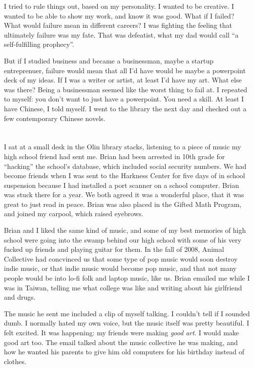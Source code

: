 I tried to rule things out, based on my personality.  I wanted to be creative.
I wanted to be able to show my work, and know it was good.  What if I failed?
What would failure mean in different careers?  I was fighting the feeling that
ultimately failure was my fate.  That was defeatist, what my dad would call ``a
self-fulfilling prophecy''.  

But if I studied business and became a businessman, maybe a startup
entreprenuer, failure would mean that all I'd have would be maybe a powerpoint
deck of my ideas.  If I was a writer or artist, at least I'd have my art.  What
else was there?  Being a businessman seemed like the worst thing to fail at.  I
repeated to myself: you don't want to just have a powerpoint.  You need a skill.
At least I have Chinese, I told myself.  I went to the library the next day and
checked out a few contemporary Chinese novels.

\section{}

I sat at a small desk in the Olin library stacks, listening to a piece of music
my high school friend had sent me.  Brian had been arrested in 10th grade for
``hacking'' the school's database, which included social security numbers.  We
had become friends when I was sent to the Harkness Center for five days of in
school suspension because I had installed a port scanner on a school computer.
Brian was stuck there for a year.  We both agreed it was a wonderful place, that
it was great to just read in peace.  Brian was also placed in the Gifted Math
Program, and joined my carpool, which raised eyebrows.

Brian and I liked the same kind of music, and some of my best memories of high
school were going into the swamp behind our high school with some of his very
fucked up friends and playing guitar for them.  In the fall of 2008, Animal
Collective had concvinced us that some type of pop music would soon destroy
indie music, or that indie music would become pop music, and that not many
people would be into lo-fi folk and laptop music, like us.  Brian emailed me
while I was in Taiwan, telling me what college was like and writing about his
girlfriend and drugs.

The music he sent me included a clip of myself talking.  I couldn't tell if I
sounded dumb.  I normally hated my own voice, but the music itself was pretty
beautiful.  I felt excited.  It was happening: my friends were making
\textit{good art}.  I would make good art too.  The email talked about the music
collective he was making, and how he wanted his parents to give him old
computers for his birthday instead of clothes.

